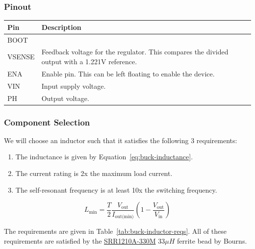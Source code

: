 \subsubsection{Pinout}
\label{sec:tps5420d-pinout}

\label{tab:tps5420d-pinout}
\begin{tabularx}{\textwidth}{l X>{\raggedright\arraybackslash}X}
        \caption{TPS5420D pinout.} \\
        \toprule
        \textbf{Pin} & \textbf{Description} \\
        \midrule
        \endhead
        BOOT & \\
        VSENSE & Feedback voltage for the regulator. This compares the divided output with a 1.221V reference. \\
        ENA & Enable pin. This can be left floating to enable the device. \\
        VIN & Input supply voltage. \\
        PH & Output voltage. \\
        \bottomrule
\end{tabularx}

\subsubsection{Component Selection}
\label{sec:tps5420d-component-selection}

We will choose an inductor such that it satisfies the following 3 requirements:
\begin{enumerate}
\item The inductance is given by Equation~\ref{eq:buck-inductance}.
\item The current rating is 2x the maximum load current.
\item The self-resonant frequency is at least 10x the switching frequency.
\end{enumerate}

\begin{equation}
        \label{eq:buck-inductance}
        L_{\text{min}} = \frac{T}{2} \frac{V_{\text{out}}}{I_{\text{out(min)}}} \left(1 -
                \frac{V_{\text{out}}}{V_{\text{in}}}\right)
\end{equation}

The requirements are given in Table~\ref{tab:buck-inductor-reqs}. All of these requirements are satisfied by the
\href{https://www.bourns.com/docs/Product-Datasheets/SRR1210A.pdf}{SRR1210A-330M} $33\si{\mu H}$ ferrite bead by Bourns.

